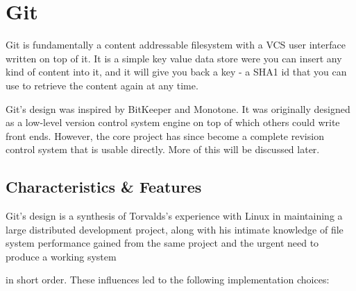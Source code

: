 \section{Git}

Git is fundamentally a content addressable filesystem with a VCS user
interface written on top of it. It is a simple key value data store
were you can insert any kind of content into it, and it will give you
back a key - a SHA1 id that you can use to retrieve the content again
at any time.

Git’s design was inspired by BitKeeper and Monotone\cite{inspiration}.
It was originally designed as a low-level version control system
engine on top of which others could write front ends. However, the
core project has since become a complete revision control system that
is usable directly. More of this will be discussed later.

\subsection{Characteristics \& Features}

Git’s design is a synthesis of Torvalds’s experience with Linux in
maintaining a large distributed development project, along with his
intimate knowledge of file system performance gained from the same
project and the urgent need to produce a working system

in short order. These influences led to the following implementation
choices:

